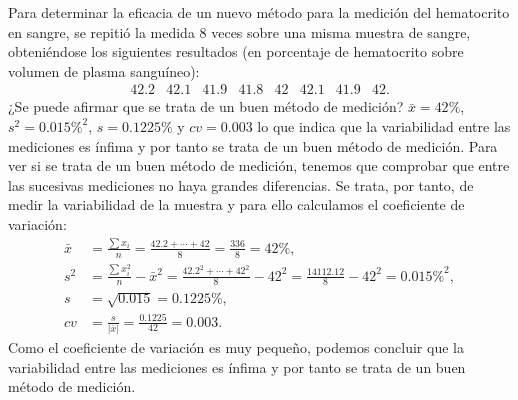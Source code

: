 {Para determinar la eficacia de un nuevo método para la medición del hematocrito en sangre, se repitió la medida 8 veces sobre una misma muestra de sangre, obteniéndose los siguientes resultados (en porcentaje de hematocrito sobre volumen de plasma sanguíneo):
\[
\begin{array}{cccccccc}
42.2 & 42.1 & 41.9 & 41.8 & 42 & 42.1 & 41.9 & 42.
\end{array}
\]
¿Se puede afirmar que se trata de un buen método de medición?
}
{$\bar x= 42\%$, $s^2=0.015\%^2$, $s=0.1225\%$ y $cv=0.003$ lo que indica que la variabilidad entre las mediciones es ínfima y por tanto se trata de un buen método de medición.
}
{Para ver si se trata de un buen método de medición, tenemos que comprobar que entre las sucesivas mediciones no haya grandes diferencias. Se trata, por tanto, de medir la variabilidad de la muestra y para ello calculamos el coeficiente de variación:
\begin{align*}
\bar x & = \frac{\sum x_i}{n} = \frac{42.2+\cdots+42}{8} = \frac{336}{8}= 42\%,\\
s^2 & = \frac{\sum x_i^2}{n}-\bar x^2 = \frac{42.2^2+\cdots+42^2}{8}-42^2 = \frac{14112.12}{8}-42^2= 0.015\%^2,\\
s &= \sqrt{0.015} = 0.1225\%,\\
cv &= \frac{s}{|\bar x|} = \frac{0.1225}{42} = 0.003.
\end{align*}
Como el coeficiente de variación es muy pequeño, podemos concluir que la variabilidad entre las mediciones es ínfima y por tanto se trata de un buen método de medición.
}


